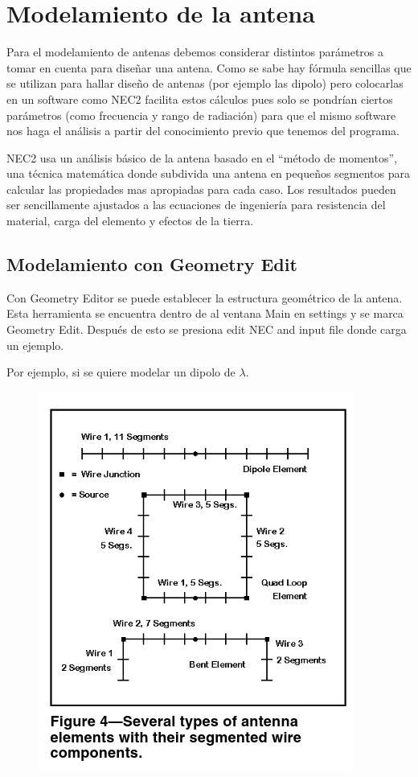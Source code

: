 \documentclass[12pt]{article}
\begin{document}
\section{Modelamiento de la antena}

Para el modelamiento de antenas debemos considerar distintos parámetros a tomar
en cuenta para diseñar una antena. Como se sabe hay fórmula sencillas que se
utilizan para hallar diseño de antenas (por ejemplo las dipolo) pero colocarlas
en un software como NEC2 facilita estos cálculos pues solo se pondrían ciertos
parámetros (como frecuencia y rango de radiación) para que el mismo software
nos haga el análisis a partir del conocimiento previo que tenemos del programa.

NEC2 usa un análisis básico de la antena basado en el ``método de momentos'',
una técnica matemática donde subdivida una antena en pequeños segmentos para
calcular las propiedades mas apropiadas para cada caso. Los resultados pueden
ser sencillamente ajustados a las ecuaciones de ingeniería para resistencia del
material, carga del elemento y efectos de la tierra. 

\subsection{Modelamiento con Geometry Edit}

Con Geometry Editor se puede establecer la estructura geométrico de la antena.
Esta herramienta se encuentra dentro de al ventana Main en settings y se marca
Geometry Edit. Después de esto se presiona edit NEC and input file donde carga
un ejemplo.

Por ejemplo, si se quiere modelar un dipolo de $\lambda$.

\begin{figure}[H]
\centering
\includegraphics[width=.4\linewidth]{images/Captura de pantalla de 2021-09-12 23-21-26.png}
\end{figure}
\end{document}
